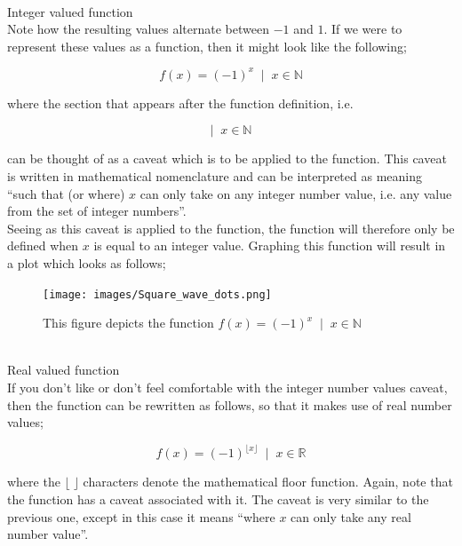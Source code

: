 \documentclass{article}
\begin{document}
\noindent
\\
\textbullet \; Integer valued function\\

Note how the resulting values alternate between $-1$ and $1$. If we were to represent these values as a function,
then it might look like the following;

\begin{equation}
\label{eqn:Square_wave}
f(x) = (-1)^{x} \;\; \vert \;\; x \in \mathbb{N} 
\end{equation} 

where the section that appears after the function definition, i.e.

\begin{equation*}
\vert \;\; x \in \mathbb{N}
\end{equation*}

can be thought of as a caveat which is to be applied to the function. This caveat is written in mathematical
nomenclature and can be interpreted as meaning ``such that (or where)  $x$ can only take on any integer number
value, i.e. any value from the set of integer numbers''.\\

Seeing as this caveat is applied to the function, the function will therefore only be defined when $x$ is equal
to an integer value. Graphing this function will result in a plot which looks as follows;

\begin{figure}[h!]
  \texttt{[image: images/Square\_wave\_dots.png]}
  \caption{This figure depicts the function $f(x) = (-1)^{x} \;\; \vert \;\; x \in \mathbb{N}$}
  \label{fig:Square_wave_dots}
\end{figure}


\noindent
\\
\textbullet \; Real valued function\\

If you don't like or don't feel comfortable with the integer number values caveat, then the function can be rewritten 
as follows, so that it makes use of real number values;

\begin{equation}
\label{eqn:Square_wave}
f(x) = (-1)^{\lfloor x\rfloor} \;\; \vert \;\; x \in \mathbb{R}
\end{equation}

where the $\lfloor\;\rfloor$ characters denote the mathematical floor function. Again, note that the function has a
caveat associated with it. The caveat is very similar to the previous one, except in this case it means 
``where  $x$ can only take any real number value''.\\
\end{document}
